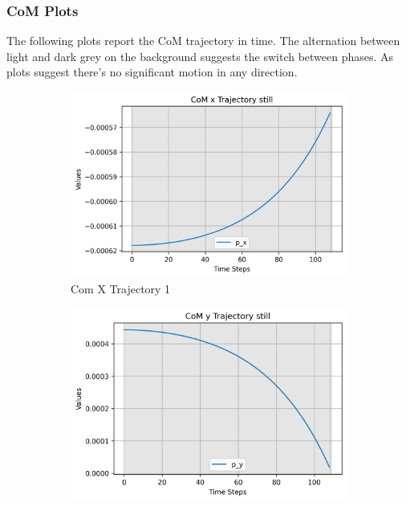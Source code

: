 \documentclass[main.tex]{subfiles}
\begin{document}
\subsubsection{CoM Plots}
The following plots report the CoM trajectory in time. 
The alternation between light and dark grey on the background suggests the switch between phases.
As plots suggest there's no significant motion in any direction.
\begin{figure}[H]
    \centering
    \begin{subfigure}[b]{0.45\textwidth}
        \centering
        \includegraphics[width=\textwidth]{figures/CoM x Trajectory still.png}
        \caption{Com X Trajectory 1}
        \label{fig:sub1_still}
    \end{subfigure}
    \hfill
    \begin{subfigure}[b]{0.45\textwidth}
        \centering
        \includegraphics[width=\textwidth]{figures/CoM y Trajectory still.png}

\end{subfigure}
\end{figure}
\end{document}
